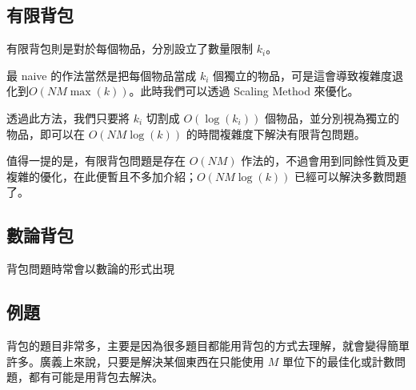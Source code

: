 \documentclass[main.tex]{subfiles}
\begin{document}
    \subsection{有限背包}
        有限背包則是對於每個物品，分別設立了數量限制 $k_i$。
        
        最 naive 的作法當然是把每個物品當成 $k_i$ 個獨立的物品，可是這會導致複雜度退化到$O(NM\max(k))$。此時我們可以透過 Scaling Method 來優化。
        
        透過此方法，我們只要將 $k_i$ 切割成 $O(\log(k_i))$ 個物品，並分別視為獨立的物品，即可以在 $O(NM\log(k))$ 的時間複雜度下解決有限背包問題。
        
        值得一提的是，有限背包問題是存在 $O(NM)$ 作法的，不過會用到同餘性質及更複雜的優化，在此便暫且不多加介紹；$O(NM\log(k))$ 已經可以解決多數問題了。
    \subsection{數論背包}
        背包問題時常會以數論的形式出現
        
    
    \subsection{例題}
        背包的題目非常多，主要是因為很多題目都能用背包的方式去理解，就會變得簡單許多。廣義上來說，只要是解決某個東西在只能使用 $M$ 單位下的最佳化或計數問題，都有可能是用背包去解決。
        
\end{document}
